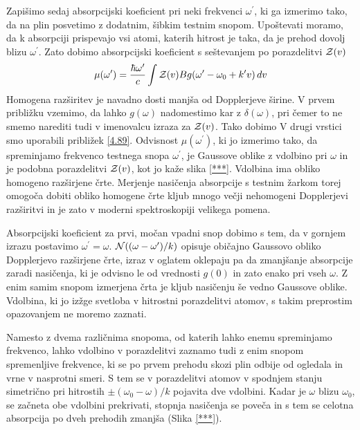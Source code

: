 Zapišimo sedaj absorpcijski koeficient pri neki frekvenci $\omega^{\prime}$,
ki ga izmerimo tako, da na plin posvetimo z dodatnim, šibkim testnim
snopom. Upoštevati moramo, da k absorpciji prispevajo vsi atomi, katerih
hitrost je taka, da je prehod dovolj blizu $\omega^{\prime}$. Zato
dobimo absorpcijski koeficient s seštevanjem po porazdelitvi ${\cal Z}(v)$
\begin{equation}
\mu(\omega^{\prime})=\frac{\hbar\omega^{\prime}}{c}\int{\cal Z}(v)Bg(\omega^{\prime}-\omega_{0}+k^{\prime}v)\, dv\label{4.90}
\end{equation}
 Homogena razširitev je navadno dosti manjša od Dopplerjeve širine.
V prvem približku vzemimo, da lahko $g(\omega)$ nadomestimo kar z
$\delta(\omega)$, pri čemer to ne smemo narediti tudi v imenovalcu
izraza za ${\cal Z}(v)$. Tako dobimo 
 V drugi vrstici smo uporabili približek \ref{4.89}. Odvisnost $\mu(\omega^{\prime})$,
ki jo izmerimo tako, da spreminjamo frekvenco testnega snopa $\omega^{\prime}$,
je Gaussove oblike z vdolbino pri $\omega$ in je podobna porazdelitvi
${\cal Z}(v)$, kot jo kaže slika \ref{***}. Vdolbina ima obliko
homogeno razširjene črte. Merjenje nasičenja absorpcije s testnim
žarkom torej omogoča dobiti obliko homogene črte kljub mnogo večji
nehomogeni Dopplerjevi razširitvi in je zato v moderni spektroskopiji
velikega pomena.

Absorpcijski koeficient za prvi, močan vpadni snop dobimo s tem, da
v gornjem izrazu postavimo $\omega^{\prime}=\omega$. ${\cal N}((\omega-\omega^{\prime})/k)$
opisuje običajno Gaussovo obliko Dopplerjevo razširjene črte, izraz
v oglatem oklepaju pa da zmanjšanje absorpcije zaradi nasičenja, ki
je odvisno le od vrednosti $g(0)$ in zato enako pri vseh $\omega$.
Z enim samim snopom izmerjena črta je kljub nasičenju še vedno Gaussove
oblike. Vdolbina, ki jo izžge svetloba v hitrostni porazdelitvi atomov,
s takim preprostim opazovanjem ne moremo zaznati.

Namesto z dvema različnima snopoma, od katerih lahko enemu spreminjamo
frekvenco, lahko vdolbino v porazdelitvi zaznamo tudi z enim snopom
spremenljive frekvence, ki se po prvem prehodu skozi plin odbije od
ogledala in vrne v nasprotni smeri. S tem se v porazdelitvi atomov
v spodnjem stanju simetrično pri hitrostih $\pm(\omega_{0}-\omega)/k$
pojavita dve vdolbini. Kadar je $\omega$ blizu $\omega_{0}$, se
začneta obe vdolbini prekrivati, stopnja nasičenja se poveča in s
tem se celotna absorpcija po dveh prehodih zmanjša (Slika \ref{***}).


